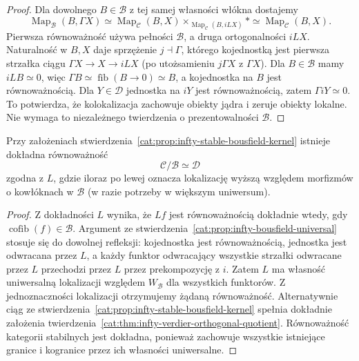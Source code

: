 \begin{proof}
Dla dowolnego $B\in\mathcal B$ z tej samej własności włókna dostajemy
\[
 \operatorname{Map}_{\mathcal B}(B,\Gamma X)
 \simeq\operatorname{Map}_{\mathcal C}(B,X)
 \times_{\operatorname{Map}_{\mathcal C}(B,iLX)}*
 \simeq\operatorname{Map}_{\mathcal C}(B,X).
\]
Pierwsza równoważność używa pełności $\mathcal B$, a druga ortogonalności $iLX$. Naturalność w $B,X$ daje sprzężenie $j\dashv\Gamma$, którego kojednostką jest pierwsza strzałka ciągu $\Gamma X\to X\to iLX$ (po utożsamieniu $j\Gamma X$ z $\Gamma X$). Dla $B\in\mathcal B$ mamy $iLB\simeq0$, więc $\Gamma B\simeq\operatorname{fib}(B\to0)\simeq B$, a kojednostka na $B$ jest równoważnością. Dla $Y\in\mathcal D$ jednostka na $iY$ jest równoważnością, zatem $\Gamma iY\simeq0$. To potwierdza, że kolokalizacja zachowuje obiekty jądra i zeruje obiekty lokalne. Nie wymaga to niezależnego twierdzenia o prezentowalności $\mathcal B$.
\end{proof}

\begin{stwierdzenie}\label{cat:prop:infty-stable-bousfield-verdier}
Przy założeniach stwierdzenia~\ref{cat:prop:infty-stable-bousfield-kernel} istnieje dokładna równoważność
\[
 \mathcal C/\mathcal B\simeq\mathcal D
\]
zgodna z $L$, gdzie iloraz po lewej oznacza lokalizację wyższą względem morfizmów o kowłóknach w $\mathcal B$ (w razie potrzeby w większym uniwersum).
\end{stwierdzenie}
\begin{proof}
Z dokładności $L$ wynika, że $Lf$ jest równoważnością dokładnie wtedy, gdy $\operatorname{cofib}(f)\in\mathcal B$. Argument ze stwierdzenia~\ref{cat:prop:infty-bousfield-universal} stosuje się do dowolnej refleksji: kojednostka jest równoważnością, jednostka jest odwracana przez $L$, a każdy funktor odwracający wszystkie strzałki odwracane przez $L$ przechodzi przez $L$ przez prekompozycję z $i$. Zatem $L$ ma własność uniwersalną lokalizacji względem $W_{\mathcal B}$ dla wszystkich funktorów. Z jednoznaczności lokalizacji otrzymujemy żądaną równoważność. Alternatywnie ciąg ze stwierdzenia~\ref{cat:prop:infty-stable-bousfield-kernel} spełnia dokładnie założenia twierdzenia~\ref{cat:thm:infty-verdier-orthogonal-quotient}. Równoważność kategorii stabilnych jest dokładna, ponieważ zachowuje wszystkie istniejące granice i kogranice przez ich własności uniwersalne.
\end{proof}

